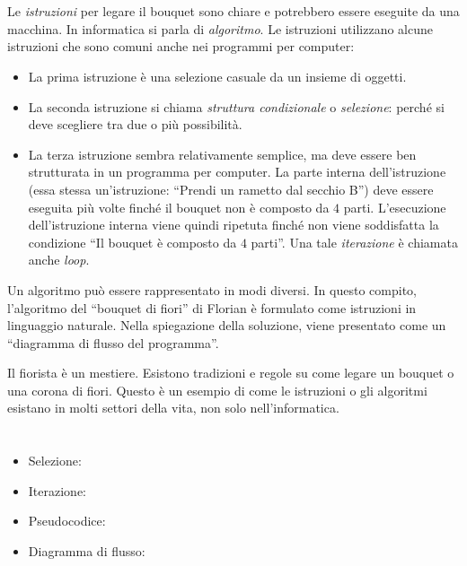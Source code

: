 {{%
\section*{\BrochureItsInformatics}
Le \emph{istruzioni} per legare il bouquet sono chiare e potrebbero essere eseguite da una macchina. In informatica si parla di \emph{algoritmo}. Le istruzioni utilizzano alcune istruzioni che sono comuni anche nei programmi per computer:

\begin{itemize}
  \item La prima istruzione è una selezione casuale da un insieme di oggetti.
  \item La seconda istruzione si chiama \emph{struttura condizionale} o \emph{selezione}: perché si deve scegliere tra due o più possibilità.
  \item La terza istruzione sembra relativamente semplice, ma deve essere ben strutturata in un programma per computer. La parte interna dell’istruzione (essa stessa un’istruzione: \enquote{Prendi un rametto dal secchio B}) deve essere eseguita più volte finché il bouquet non è composto da $4$ parti. L’esecuzione dell’istruzione interna viene quindi ripetuta finché non viene soddisfatta la condizione \enquote{Il bouquet è composto da $4$ parti}. Una tale \emph{iterazione} è chiamata anche \emph{loop}.
\end{itemize}

Un algoritmo può essere rappresentato in modi diversi.  In questo compito, l’algoritmo del \enquote{bouquet di fiori} di Florian è formulato come istruzioni in linguaggio naturale. Nella spiegazione della soluzione, viene presentato come un \enquote{diagramma di flusso del programma}.

Il fiorista è un mestiere. Esistono tradizioni e regole su come legare un bouquet o una corona di fiori. Questo è un esempio di come le istruzioni o gli algoritmi esistano in molti settori della vita, non solo nell’informatica.



\section*{\BrochureWebsitesAndKeywords}
{\raggedright
\begin{itemize}
  \item Selezione: \href{https://it.wikipedia.org/wiki/Selezione_(informatica)}{}
  \item Iterazione: \href{https://it.wikipedia.org/wiki/Iterazione}{}
  \item Pseudocodice: \href{https://it.wikipedia.org/wiki/Pseudocodice}{}
  \item Diagramma di flusso: \href{https://it.wikipedia.org/wiki/Diagramma_di_flusso}{}
\end{itemize}


}}}
